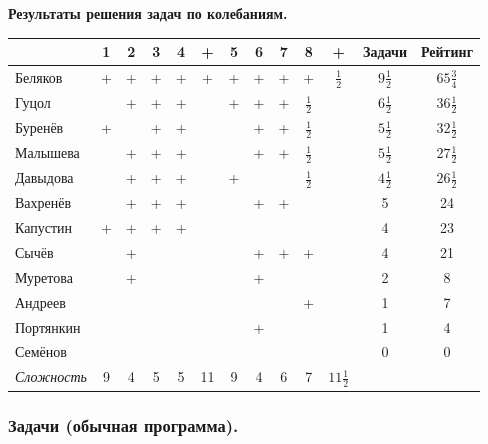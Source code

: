 \documentclass[12pt]{article}
\newlength{\h}
\newlength{\x}
\begin{document}

\begin{center}
  \textbf{Результаты решения задач по колебаниям. }
\end{center}

\begin{center}
  \begin{tabular}{|l| c|c|c|c|c| c|c|c|c|c| c|c|}
    \hline
    & 1 & 2 & 3 & 4 & + & 5 & 6 & 7 & 8 & + & Задачи & Рейтинг \\
    \hline
    Беляков & + & + & + & + & + & + & + & + & + & $\frac{1}{2}$ & $9\frac{1}{2}$ & $65\frac{3}{4}$ \\
    \hline
    Гуцол &  & + & + & + &  & + & + & + & $\frac{1}{2}$ & & $6\frac{1}{2}$ & $36\frac{1}{2}$ \\
    \hline
    Буренёв & + & & + & + &  &  & + & + & $\frac{1}{2}$ & & $5\frac{1}{2}$ & $32\frac{1}{2}$ \\
    \hline
    Малышева &  & + & + & + &  &  & + & + & $\frac{1}{2}$ & & $5\frac{1}{2}$ & $27\frac{1}{2}$ \\
    \hline
    Давыдова &  & + & + & + &  & + & & & $\frac{1}{2}$ & & $4\frac{1}{2}$ & $26\frac{1}{2}$ \\
    \hline
    Вахренёв &  & + & + & + &  &  & + & + & & & 5 & 24 \\
    \hline
    Капустин & + & + & + & + &  &  &  &  &  &  & 4 & 23 \\
    \hline
    Сычёв &  & + &  &  &  &  & + & + & + &  & 4 & 21 \\
    \hline
    Муретова &  & + &  &  &  &  & + &  &  &  & 2 & 8 \\
    \hline
    Андреев &  &  &  &  &  &  &  &  & + &  & 1 & 7 \\
    \hline
    Портянкин &  &  &  &  &  &  & + &  &  &  & 1 & 4 \\
    \hline
    Семёнов &  &  &  &  &  &  &  &  &  &  & 0 & 0 \\
    \hline
    \textit{Сложность} & 9 & 4 & 5 & 5 & 11 & 9 & 4 & 6 & 7 & $11\frac{1}{2}$ &  & \\
    \hline
  \end{tabular}
\end{center}


\subsubsection{Задачи (обычная программа).}
\label{sec:daily10pr-norm}
\end{document}
